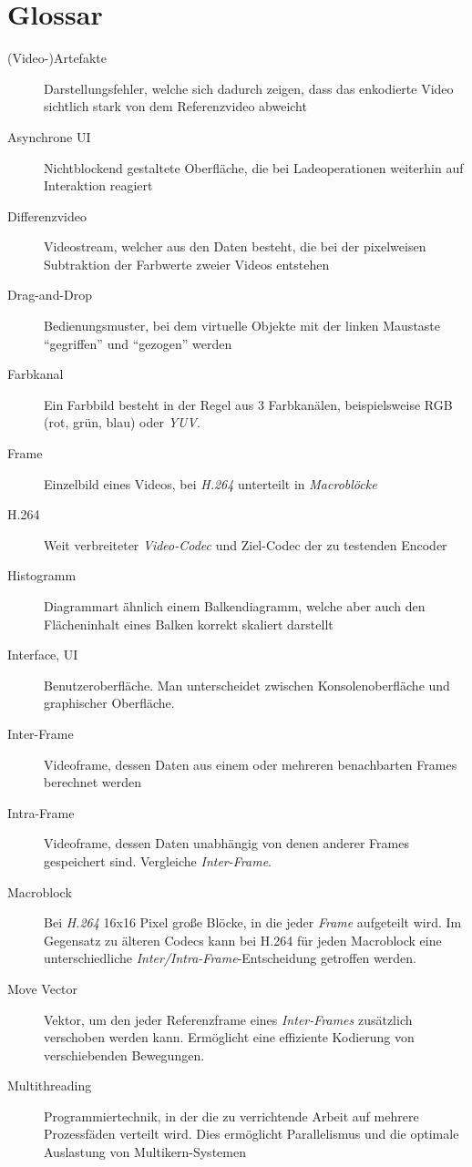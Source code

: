 \section{Glossar}

\begin{description}
    \item[(Video-)Artefakte] Darstellungsfehler, welche sich dadurch zeigen, dass das enkodierte Video sichtlich stark von dem Referenzvideo abweicht
    \item[Asynchrone UI] Nichtblockend gestaltete Oberfläche, die bei Ladeoperationen weiterhin auf Interaktion reagiert

    \item[Differenzvideo] Videostream, welcher aus den Daten besteht, die bei der pixelweisen Subtraktion der Farbwerte zweier Videos entstehen
    \item[Drag-and-Drop] Bedienungsmuster, bei dem virtuelle Objekte mit der linken Maustaste ``gegriffen'' und ``gezogen'' werden

    \item[Farbkanal] Ein Farbbild besteht in der Regel aus 3 Farbkanälen, beispielsweise RGB (rot, grün, blau) oder \emph{YUV}.
    \item[Frame] Einzelbild eines Videos, bei \emph{H.264} unterteilt in \emph{Macroblöcke}

    \item[H.264] Weit verbreiteter \emph{Video-Codec} und Ziel-Codec der zu testenden Encoder
    \item[Histogramm] Diagrammart ähnlich einem Balkendiagramm, welche aber auch den Flächeninhalt eines Balken korrekt skaliert darstellt

    \item[Interface, UI] Benutzeroberfläche. Man unterscheidet zwischen Konsolenoberfläche und graphischer Oberfläche.
    \item[Inter-Frame] Videoframe, dessen Daten aus einem oder mehreren benachbarten Frames berechnet werden
    \item[Intra-Frame] Videoframe, dessen Daten unabhängig von denen anderer Frames gespeichert sind. Vergleiche \emph{Inter-Frame}.

    \item[Macroblock] Bei \emph{H.264} 16x16 Pixel große Blöcke, in die jeder \emph{Frame} aufgeteilt wird. Im Gegensatz zu älteren Codecs kann bei H.264 für jeden Macroblock eine unterschiedliche \emph{Inter/Intra-Frame}-Entscheidung getroffen werden. 
    \item[Move Vector] Vektor, um den jeder Referenzframe eines \emph{Inter-Frames} zusätzlich verschoben werden kann. Ermöglicht eine effiziente Kodierung von verschiebenden Bewegungen.
    \item[Multithreading] Programmiertechnik, in der die zu verrichtende Arbeit auf mehrere Prozessfäden verteilt wird. Dies ermöglicht Parallelismus und die optimale Auslastung von Multikern-Systemen


\end{description}
